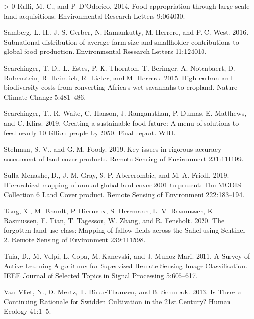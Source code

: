 \documentclass[11pt,a4paper]{article}
\newlength{\cslhangindent}
\newenvironment{CSLReferences}[3] %
 {%
  \setlength{\parindent}{0pt}
  \ifodd #1 \everypar{\setlength{\hangindent}{\cslhangindent}}\ignorespaces\fi
  \ifnum #2 > 0
  \setlength{\parskip}{#2\baselineskip}
  \fi
 }%
 {}
\begin{document}
\begin{CSLReferences}{1}{0}
\leavevmode\hypertarget{ref-RulliFoodappropriationlarge2014}{}%
Rulli, M. C., and P. D'Odorico. 2014. Food appropriation through large
scale land acquisitions. Environmental Research Letters 9:064030.

\leavevmode\hypertarget{ref-SambergSubnationaldistributionaverage2016}{}%
Samberg, L. H., J. S. Gerber, N. Ramankutty, M. Herrero, and P. C. West.
2016. Subnational distribution of average farm size and smallholder
contributions to global food production. Environmental Research Letters
11:124010.

\leavevmode\hypertarget{ref-SearchingerHighcarbonbiodiversity2015}{}%
Searchinger, T. D., L. Estes, P. K. Thornton, T. Beringer, A.
Notenbaert, D. Rubenstein, R. Heimlich, R. Licker, and M. Herrero. 2015.
High carbon and biodiversity costs from converting {Africa}'s wet
savannahs to cropland. Nature Climate Change 5:481--486.

\leavevmode\hypertarget{ref-searchingerCreatingSustainableFood2019}{}%
Searchinger, T., R. Waite, C. Hanson, J. Ranganathan, P. Dumas, E.
Matthews, and C. Klirs. 2019. Creating a sustainable food future: {A}
menu of solutions to feed nearly 10 billion people by 2050. {Final}
report. {WRI}.

\leavevmode\hypertarget{ref-StehmanKeyissuesrigorous2019}{}%
Stehman, S. V., and G. M. Foody. 2019. Key issues in rigorous accuracy
assessment of land cover products. Remote Sensing of Environment
231:111199.

\leavevmode\hypertarget{ref-sulla-menasheHierarchicalMappingAnnual2019}{}%
Sulla-Menashe, D., J. M. Gray, S. P. Abercrombie, and M. A. Friedl.
2019. Hierarchical mapping of annual global land cover 2001 to present:
{The MODIS Collection} 6 {Land Cover} product. Remote Sensing of
Environment 222:183--194.

\leavevmode\hypertarget{ref-Tongforgottenlanduse2020}{}%
Tong, X., M. Brandt, P. Hiernaux, S. Herrmann, L. V. Rasmussen, K.
Rasmussen, F. Tian, T. Tagesson, W. Zhang, and R. Fensholt. 2020. The
forgotten land use class: {Mapping} of fallow fields across the {Sahel}
using {Sentinel}-2. Remote Sensing of Environment 239:111598.

\leavevmode\hypertarget{ref-tuiaSurveyActiveLearning2011}{}%
Tuia, D., M. Volpi, L. Copa, M. Kanevski, and J. Munoz-Mari. 2011. A
{Survey} of {Active Learning Algorithms} for {Supervised Remote Sensing
Image Classification}. IEEE Journal of Selected Topics in Signal
Processing 5:606--617.

\leavevmode\hypertarget{ref-vanvlietThereContinuingRationale2013}{}%
Van Vliet, N., O. Mertz, T. Birch-Thomsen, and B. Schmook. 2013. Is
{There} a {Continuing Rationale} for {Swidden Cultivation} in the 21st
{Century}? Human Ecology 41:1--5.


\end{CSLReferences}
\end{document}
